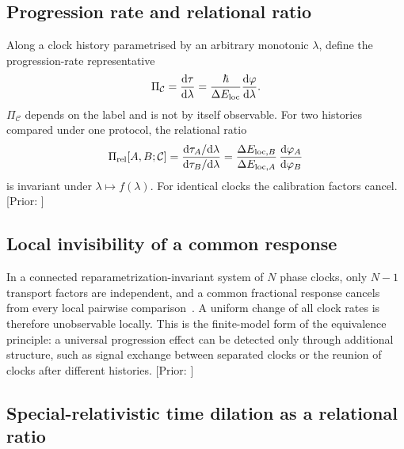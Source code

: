 \documentclass[11pt]{article}
\newcommand{\Pg}{\Pi}                 %
\newcommand{\cph}{\varphi}            %
\newcommand{\Eloc}{E_{\rm loc}}       %
\newcommand{\dd}{\mathrm{d}}
\newcommand{\st}[1]{\textsf{\small[#1]}}
\theoremstyle{plain}
\theoremstyle{definition}
\theoremstyle{remark}
\begin{document}
\subsection{Progression rate and relational ratio}

Along a clock history parametrised by an arbitrary monotonic $\lambda$, define the progression-rate representative
\begin{equation}
\Pg_{\mathcal C} = \frac{\dd\tau}{\dd\lambda} = \frac{\hbar}{\Delta\Eloc}\frac{\dd\cph}{\dd\lambda}.
\label{eq:Pi}
\end{equation}
$\Pg_{\mathcal C}$ depends on the label and is not by itself observable. For two histories compared under one protocol, the relational ratio
\begin{equation}
\Pg_{\rm rel}[A,B;\mathcal C] = \frac{\dd\tau_A/\dd\lambda}{\dd\tau_B/\dd\lambda}
= \frac{\Delta E_{{\rm loc},B}}{\Delta E_{{\rm loc},A}}\,\frac{\dd\cph_A}{\dd\cph_B}
\label{eq:Pirel}
\end{equation}
is invariant under $\lambda\mapsto f(\lambda)$. For identical clocks the calibration factors cancel. \st{Prior: \cite{JordanHDA,JordanDirection}}

\subsection{Local invisibility of a common response}

In a connected reparametrization-invariant system of $N$ phase clocks, only $N-1$ transport factors are independent, and a common fractional response cancels from every local pairwise comparison~\cite{JordanClocks}. A uniform change of all clock rates is therefore unobservable locally. This is the finite-model form of the equivalence principle: a universal progression effect can be detected only through additional structure, such as signal exchange between separated clocks or the reunion of clocks after different histories. \st{Prior: \cite{JordanClocks}}

\subsection{Special-relativistic time dilation as a relational ratio}
\label{sec:SR}
\end{document}
